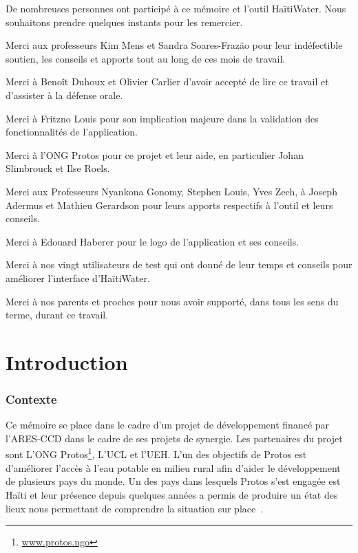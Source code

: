 \documentclass{EPL-master-thesis-covers-FR}
\begin{document}
		De nombreuses personnes ont participé à ce mémoire et l'outil HaïtiWater. Nous souhaitons prendre quelques instants pour les remercier.

		Merci aux professeurs Kim Mens et Sandra Soares-Frazão pour leur indéfectible soutien, les conseils et apports tout au long de ces mois de travail.

		Merci à Benoît Duhoux et Olivier Carlier d'avoir accepté de lire ce travail et d'assister à la défense orale.

		Merci à Fritzno Louis pour son implication majeure dans la validation des fonctionnalités de l'application.

		Merci à l'ONG Protos pour ce projet et leur aide, en particulier Johan Slimbrouck et Ilse Roels.

		Merci aux Professeurs Nyankona Gonomy, Stephen Louis, Yves Zech, à Joseph Adermus et Mathieu Gerardson pour leurs apports respectifs à l'outil et leurs conseils.

		Merci à Edouard Haberer pour le logo de l'application et ses conseils.

		Merci à nos vingt utilisateurs de test qui ont donné de leur temps et conseils pour améliorer l'interface d'HaïtiWater.

		Merci à nos parents et proches pour nous avoir supporté, dans tous les sens du terme, durant ce travail.

	\chapter{Introduction}



		\subsection*{Contexte}

			Ce mémoire se place dans le cadre d'un projet de développement financé par l'ARES-CCD dans le cadre de ses projets de synergie. Les partenaires du projet sont L'ONG Protos\footnote{\href{https://www.protos.ngo/fr/}{www.protos.ngo}}, L'UCL et l'UEH. L'un des objectifs de Protos est d'améliorer l'accès à l'eau potable en milieu rural afin d'aider le développement de plusieurs pays du monde. Un des pays dans lesquels Protos s'est engagée est Haïti et leur présence depuis quelques années a permis de produire un état des lieux nous permettant de comprendre la situation sur place~\cite{ref:analyse_contextuelle_commune}.
\end{document}
